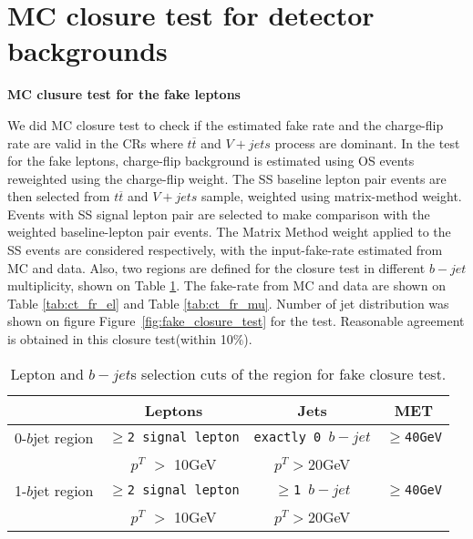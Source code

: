 \clearpage 
\section{MC closure test for detector backgrounds}
\label{app:ClosureTest}

\par{\bf}
\par{\bf MC clusure test for the fake leptons}

We did MC closure test to check if the estimated fake rate and the charge-flip rate are valid in the CRs where $t\overline{t}$ and $V+jets$ process are dominant.
In the test for the fake leptons, charge-flip background is estimated using OS events reweighted using the charge-flip weight.
The SS baseline lepton pair events are then selected from $t\overline{t}$ and $V+jets$ sample, weighted using matrix-method weight.
Events with SS signal lepton pair are selected to make comparison with the weighted baseline-lepton pair events.
The Matrix Method weight applied to the SS events are considered respectively, with the input-fake-rate estimated from MC and data.
Also, two regions are defined for the closure test in different $b-jet$ multiplicity, shown on Table \ref{tab:region_closure_test_fake}.
The fake-rate from MC and data are shown on Table \ref{tab:ct_fr_el} and Table \ref{tab:ct_fr_mu}.
Number of jet distribution was shown on figure Figure~\ref{fig:fake_closure_test} for the test.
Reasonable agreement is obtained in this closure test(within 10$\%$).

\begin{table}[!htb]
\centering
\begin{tabular}{|l|c|c|c|}
\hline
 & Leptons & Jets & MET \\
\hline \hline
0-$b$jet region      & \texttt{$\geq$2 signal lepton} &  \texttt{exactly 0 $b-jet$} & \texttt{$\geq$40GeV}  \\
                   & $p^{T}$ $>$ 10GeV & $p^{T}$$>$20GeV  & \\
\hline
1-$b$jet region      & \texttt{$\geq$2 signal lepton} &  \texttt{$\geq$1 $b-jet$} & \texttt{$\geq$40GeV}  \\
                   & $p^{T}$ $>$ 10GeV & $p^{T}$$>$20GeV  & \\
\hline
\end{tabular}
\caption{Lepton and $b-jet$s selection cuts of the region for fake closure test.}
\label{tab:region_closure_test_fake}
\end{table}


